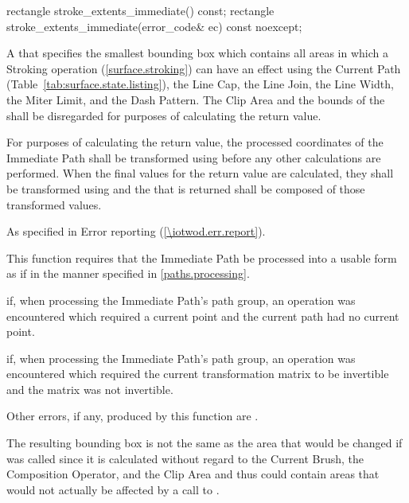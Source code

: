 \begin{itemdecl}
rectangle stroke_extents_immediate() const;
rectangle stroke_extents_immediate(error_code& ec) const noexcept;
\end{itemdecl}
\begin{itemdescr}
\pnum
\returns
A  that specifies the smallest bounding box which contains all areas in which a Stroking operation (\ref{surface.stroking}) can have an effect using the Current Path (Table~\ref{tab:surface.state.listing}), the Line Cap, the Line Join, the Line Width, the Miter Limit, and the Dash Pattern. The Clip Area and the bounds of the \underlyingsurface shall be disregarded for purposes of calculating the return value.

\pnum
For purposes of calculating the return value, the processed coordinates of the Immediate Path shall be transformed using  before any other calculations are performed. When the final values for the return value are calculated, they shall be transformed using  and the  that is returned shall be composed of those transformed values.

\pnum
\throws
As specified in Error reporting (\ref{\iotwod.err.report}).

\pnum
\remarks
This function requires that the Immediate Path be processed into a usable form as if in the manner specified in \ref{paths.processing}.

\pnum
\errors
{} if, when processing the Immediate Path's path group, an operation was encountered which required a current point and the current path had no current point.

\pnum
{} if, when processing the Immediate Path's path group, an operation was encountered which required the current transformation matrix to be invertible and the matrix was not invertible.

\pnum
Other errors, if any, produced by this function are .

\pnum
\realnotes
The resulting bounding box is not the same as the area that would be changed if  was called since it is calculated without regard to the Current Brush, the Composition Operator, and the Clip Area and thus could contain areas that would not actually be affected by a call to .
\end{itemdescr}

